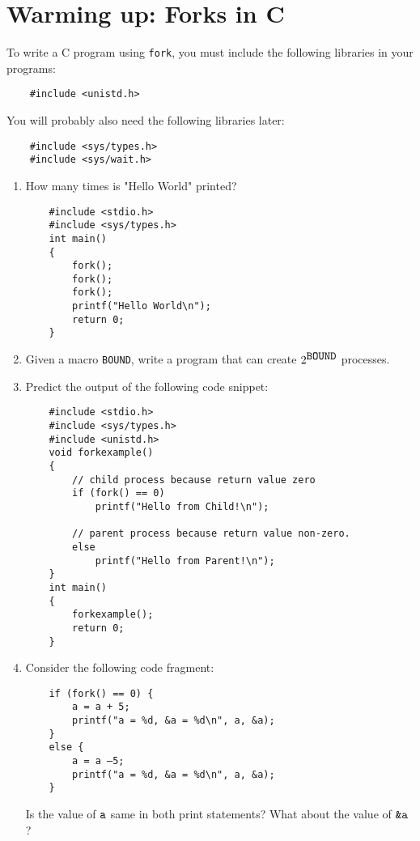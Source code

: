 \documentclass[11pt]{article}
\newcommand{\numtd}{03}
\newcommand{\titretd}{Processes and Signals}
\begin{document}
	
	\entete{\numtd}{\titretd}


\section{Warming up: Forks in C}

To write a C program using \verb*|fork|, you must include the following libraries in your programs:

\begin{verbatim}
	#include <unistd.h>
\end{verbatim}

You will probably also need the following libraries later:

\begin{verbatim}
	#include <sys/types.h>
	#include <sys/wait.h>
\end{verbatim}

\begin{enumerate}
\item How many times is "Hello World" printed?
\begin{verbatim}
	#include <stdio.h>
	#include <sys/types.h>
	int main()
	{
		fork();
		fork();
		fork();
		printf("Hello World\n");
		return 0;
	}
\end{verbatim}
\item Given a macro \verb|BOUND|, write a program that can create $2^{\verb|BOUND|}$ processes. 

\item Predict the output of the following code snippet:
\begin{verbatim}
	#include <stdio.h>
	#include <sys/types.h>
	#include <unistd.h>
	void forkexample()
	{
		// child process because return value zero
		if (fork() == 0)
			printf("Hello from Child!\n");
		
		// parent process because return value non-zero.
		else
			printf("Hello from Parent!\n");
	}
	int main()
	{
		forkexample();
		return 0;
	}
\end{verbatim}

\item Consider the following code fragment:
\begin{verbatim}
	if (fork() == 0) {
		a = a + 5;
		printf("a = %d, &a = %d\n", a, &a);
	}
	else {
		a = a –5;
		printf("a = %d, &a = %d\n", a, &a);
	}
\end{verbatim}
Is the value of $\verb*|a|$ same in both print statements? What about the value of $\verb*|&a|$ ?
\end{enumerate}
\end{document}
